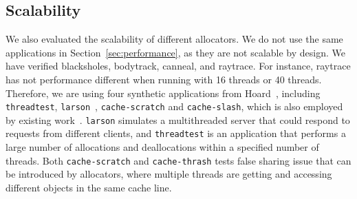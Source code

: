 \subsection{Scalability}
\label{sec:scale}

We also evaluated the scalability of different allocators. We do not use the same applications in Section~\ref{sec:performance}, as they are not scalable by design. We have verified blacksholes, bodytrack, canneal, and raytrace. For instance, raytrace has not performance different when running with 16 threads or 40 threads. Therefore, we are using four synthetic applications from Hoard~\cite{Hoard}, including \texttt{threadtest}, \texttt{larson}~\cite{Larson}, \texttt{cache-scratch} and \texttt{cache-slash}, which is also employed by existing work~\cite{Scalloc}. \texttt{larson} simulates a multithreaded server that could respond to requests from different clients, and \texttt{threadtest} is an application that performs a large number of allocations and deallocations within a specified number of threads. Both \texttt{cache-scratch} and \texttt{cache-thrash} tests false sharing issue that can be introduced by allocators, where  multiple threads are getting and accessing different objects in the same cache line. 

